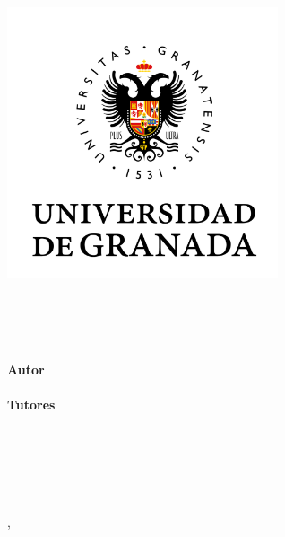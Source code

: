 \begin{titlepage}
    \begin{addmargin}[-3.45cm]{-3cm}
    \begin{center}
        \large  

        \hfill

        \includegraphics[width=8cm]{gfx/ugr_icon} \\ \medskip

        \vfill

        \begingroup
            \color{NavyBlue}\spacedallcaps{\myTitle} \\ \bigskip
        \endgroup

        \spacedlowsmallcaps{\mySubtitle}

        \vfill

        \myWork \\ 
        \myDegree \\ \bigskip
        \textbf{Autor} \\
        \myName \\ \medskip
        \textbf{Tutores} \\
        \myProf \\
        \myOtherProf \\ \bigskip
        \spacedlowsmallcaps{\myFaculty} \\ \medskip
        \spacedlowsmallcaps{\myOtherFacultyA} \\
        \spacedlowsmallcaps{\myOtherFacultyB} \\ \bigskip

        \myLocation, \myTime %

        \vfill                      

    \end{center}  
  \end{addmargin}       
\end{titlepage}   